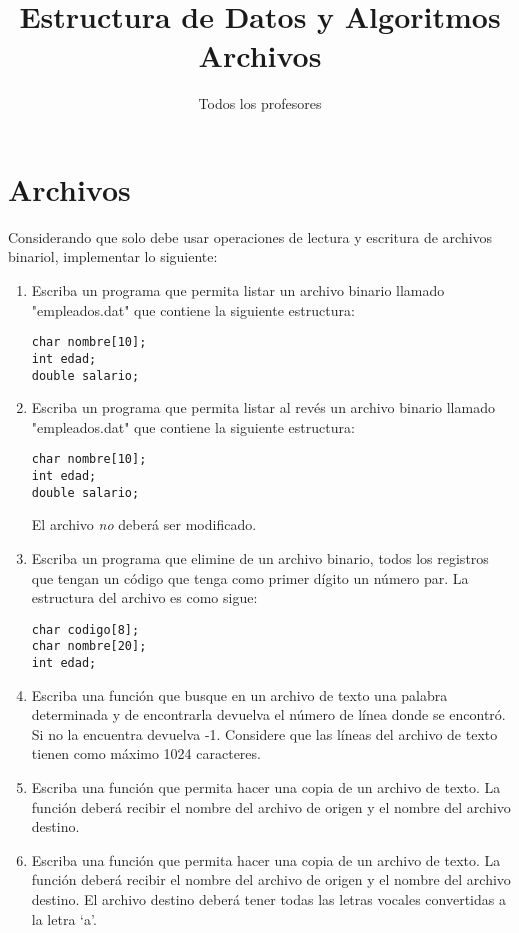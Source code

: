 \documentclass{article}
\title{Estructura de Datos y Algoritmos \\
  \large Archivos}
\author{Todos los profesores}
\date{\the\year}
\begin{document}
\maketitle

\section{Archivos}
Considerando que solo debe usar operaciones de lectura y escritura de archivos binariol, implementar lo siguiente:
\begin{enumerate}
  \item Escriba un programa que permita listar un archivo binario llamado 
        "empleados.dat" que contiene la siguiente estructura:

\begin{lstlisting}
char nombre[10];
int edad;
double salario;
\end{lstlisting}

  \item Escriba un programa que permita listar al revés un archivo binario
        llamado "empleados.dat" que contiene la siguiente estructura:

\begin{lstlisting}
char nombre[10];
int edad;
double salario;
\end{lstlisting}

	El archivo \emph{no} deberá ser modificado.
  \item Escriba un programa que elimine de un archivo binario, todos los
        registros que tengan un código que tenga como primer dígito un
        número par. La estructura del archivo es como sigue:

\begin{lstlisting}
char codigo[8];
char nombre[20];
int edad;
\end{lstlisting}

  \item Escriba una función que busque en un archivo de texto una palabra
        determinada y de encontrarla devuelva el número de línea donde se
        encontró. Si no la encuentra devuelva -1. Considere que las líneas
        del archivo de texto tienen como máximo 1024 caracteres.

  \item Escriba una función que permita hacer una copia de un archivo de texto.
        La función deberá recibir el nombre del archivo de origen y el nombre
        del archivo destino.

  \item Escriba una función que permita hacer una copia de un archivo de
        texto. La función deberá recibir el nombre del archivo de origen y
        el nombre del archivo destino. El archivo destino deberá tener todas
        las letras vocales convertidas a la letra ‘a’.


\end{enumerate}
\end{document}
